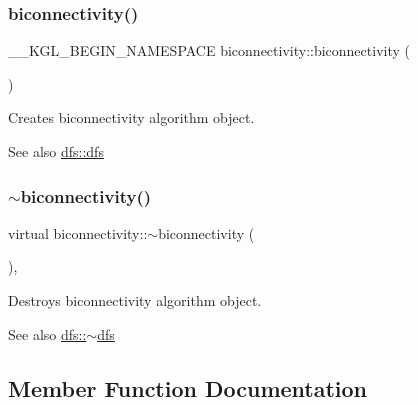 \subsubsection{\texorpdfstring{biconnectivity()}{biconnectivity()}}
{\footnotesize\ttfamily \+\_\+\+\_\+\+K\+G\+L\+\_\+\+B\+E\+G\+I\+N\+\_\+\+N\+A\+M\+E\+S\+P\+A\+CE biconnectivity\+::biconnectivity (\begin{DoxyParamCaption}{ }\end{DoxyParamCaption})}



Creates biconnectivity algorithm object. 

\begin{DoxySeeAlso}{See also}
\mbox{\hyperlink{classdfs_a5232bc41ab202b6278a84bd97c803a0d}{dfs\+::dfs}} 
\end{DoxySeeAlso}
\mbox{\label{classbiconnectivity_af8e2bb061de4a08f95a2a3a94fdbd797}} 
\subsubsection{\texorpdfstring{$\sim$biconnectivity()}{~biconnectivity()}}
{\footnotesize\ttfamily virtual biconnectivity\+::$\sim$biconnectivity (\begin{DoxyParamCaption}{ }\end{DoxyParamCaption})\hspace{0.3cm}{\ttfamily [inline]}, {\ttfamily [virtual]}}



Destroys biconnectivity algorithm object. 

\begin{DoxySeeAlso}{See also}
\mbox{\hyperlink{classdfs_aff2e95c12935221a94551393f7e36c6e}{dfs\+::$\sim$dfs}} 
\end{DoxySeeAlso}


\subsection{Member Function Documentation}
\mbox{\label{classbiconnectivity_ac5295da180114bffbbfd621d644d4c58}} 
